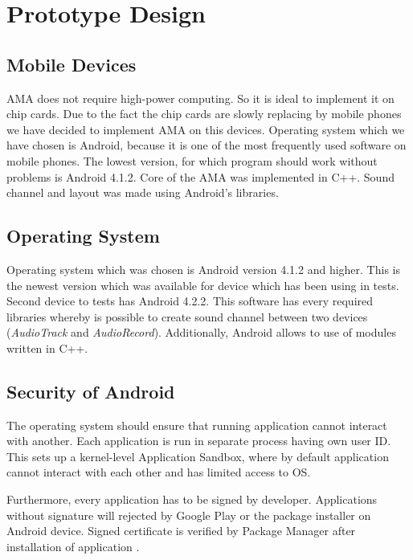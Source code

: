 \documentclass[11pt,titlepage]{article}
\theoremstyle{plain}
\begin{document}
\section{Prototype Design}
\subsection{Mobile Devices}

AMA does not require high-power computing. So it is ideal to implement it on chip cards. Due to the fact the chip cards are slowly replacing by mobile phones we have decided to implement AMA on this devices. Operating system which we have chosen is Android, because it is one of the most frequently used software on mobile phones. The lowest version, for which program should work without problems is Android 4.1.2. Core of the AMA was implemented in C++. Sound channel and layout was made using Android's libraries. 

\subsection{Operating System}

Operating system which was chosen is Android version 4.1.2 and higher. This is the newest version which was available for device which has been using in tests. Second device to tests has Android 4.2.2. This software has every required libraries whereby is possible to create sound channel between two devices (\textit{AudioTrack} and \textit{AudioRecord}). Additionally, Android allows to use of modules written in C++. 

\subsection{Security of Android}

The operating system should ensure that running application cannot interact with another. Each application is run in separate process having own user ID. This sets up a kernel-level Application Sandbox, where by default application cannot interact with each other and has limited access to OS.

\vspace{5mm}

Furthermore, every application has to be signed by developer. Applications without signature will rejected by Google Play or the package installer on Android device. Signed certificate is verified by Package Manager after installation of application \cite{android_sec}.
\end{document}
